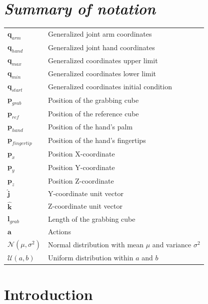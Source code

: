 \documentclass[a4paper]{article}
\begin{document}
\section*{\textit{Summary of notation}}
\vspace{1cm}
\begin{tabular}{p{2cm} p{8cm}}
    $\bm q_{arm}$ & Generalized joint arm coordinates\\
    $\bm q_{hand}$ & Generalized joint hand coordinates\\
    $\bm q_{max}$ & Generalized coordinates upper limit\\
    $\bm q_{min}$ & Generalized coordinates lower limit\\
    $\bm q_{start}$ & Generalized coordinates initial condition\\
    $\bm p_{grab}$ & Position of the grabbing cube\\
    $\bm p_{ref}$ & Position of the reference cube\\
    $\bm p_{hand}$ & Position of the hand's palm\\
    $\bm p_{fingertip}$ & Position of the hand's fingertips\\
    $\bm p_{x}$ & Position X-coordinate\\
    $\bm p_{y}$ & Position Y-coordinate\\
    $\bm p_{z}$ & Position Z-coordinate\\
    $\hat{\bm j}$ & Y-coordinate unit vector\\
    $\hat{\bm k}$ & Z-coordinate unit vector\\
    $\bm l_{grab}$ & Length of the grabbing cube\\
    $\bm a$ & Actions\\
    $\mathcal{N}(\mu, \sigma^2)$ & Normal distribution with mean $\mu$ and variance $\sigma^2$\\
    $\mathcal{U}(a, b)$ & Uniform distribution within $a$ and $b$\\
\end{tabular}


\newpage
\tableofcontents
\newpage



\newpage

\section{Introduction}
\end{document}
